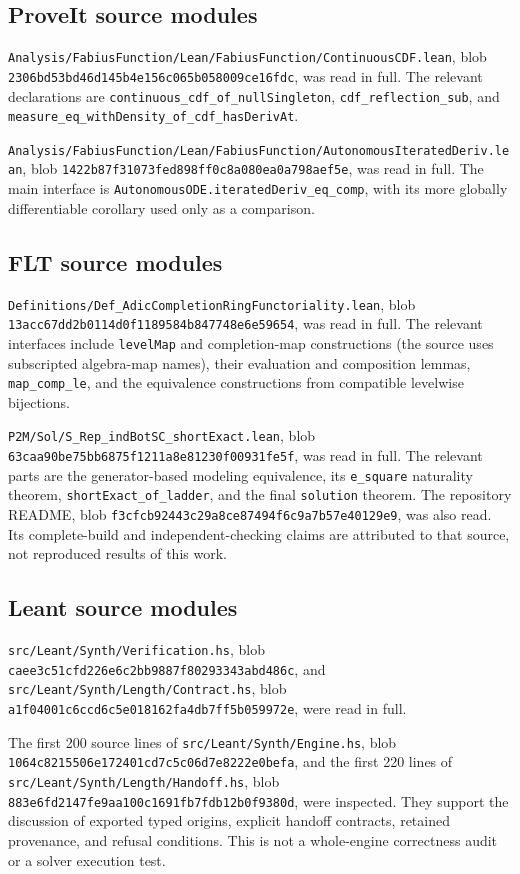 \documentclass[11pt,a4paper]{article}
\newcommand{\code}[1]{\nolinkurl{#1}}
\theoremstyle{plain}
\theoremstyle{definition}
\theoremstyle{remark}
\begin{document}
\subsection{ProveIt source modules}
\code{Analysis/FabiusFunction/Lean/FabiusFunction/ContinuousCDF.lean}, blob
\code{2306bd53bd46d145b4e156c065b058009ce16fdc}, was read in full. The
relevant declarations are \code{continuous_cdf_of_nullSingleton},
\code{cdf_reflection_sub}, and
\code{measure_eq_withDensity_of_cdf_hasDerivAt}.

\code{Analysis/FabiusFunction/Lean/FabiusFunction/AutonomousIteratedDeriv.lean},
blob \code{1422b87f31073fed898ff0c8a080ea0a798aef5e}, was read in full.
The main interface is \code{AutonomousODE.iteratedDeriv_eq_comp}, with its
more globally differentiable corollary used only as a comparison.

\subsection{FLT source modules}
\code{Definitions/Def_AdicCompletionRingFunctoriality.lean}, blob
\code{13acc67dd2b0114d0f1189584b847748e6e59654}, was read in full. The
relevant interfaces include \code{levelMap} and completion-map constructions
(the source uses subscripted algebra-map names), their evaluation and
composition lemmas, \code{map_comp_le}, and the equivalence constructions
from compatible levelwise bijections.

\code{P2M/Sol/S_Rep_indBotSC_shortExact.lean}, blob
\code{63caa90be75bb6875f1211a8e81230f00931fe5f}, was read in full.
The relevant parts are the generator-based modeling equivalence, its
\code{e_square} naturality theorem, \code{shortExact_of_ladder}, and the
final \code{solution} theorem. The repository README, blob
\code{f3cfcb92443c29a8ce87494f6c9a7b57e40129e9}, was also read.
Its complete-build and independent-checking claims are attributed to that
source, not reproduced results of this work.

\subsection{Leant source modules}
\code{src/Leant/Synth/Verification.hs}, blob
\code{caee3c51cfd226e6c2bb9887f80293343abd486c}, and
\code{src/Leant/Synth/Length/Contract.hs}, blob
\code{a1f04001c6ccd6c5e018162fa4db7ff5b059972e}, were read in full.

The first 200 source lines of \code{src/Leant/Synth/Engine.hs}, blob
\code{1064c8215506e172401cd7c5c06d7e8222e0befa}, and the first 220 lines of
\code{src/Leant/Synth/Length/Handoff.hs}, blob
\code{883e6fd2147fe9aa100c1691fb7fdb12b0f9380d}, were inspected.
They support the discussion of exported typed origins, explicit handoff
contracts, retained provenance, and refusal conditions. This is not a
whole-engine correctness audit or a solver execution test.
\end{document}
